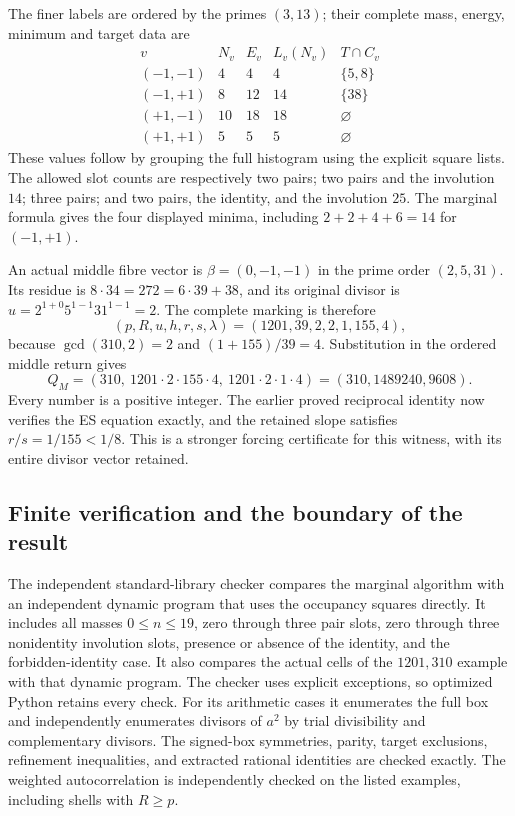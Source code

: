 The finer labels are ordered by the primes $(3,13)$; their complete
mass, energy, minimum and target data are
\[
\begin{array}{c|r|r|r|l}
v&N_v&E_v&L_v(N_v)&T\cap C_v\\\hline
(-1,-1)&4&4&4&\{5,8\}\\
(-1,+1)&8&12&14&\{38\}\\
(+1,-1)&10&18&18&\varnothing\\
(+1,+1)&5&5&5&\varnothing
\end{array}
\]
These values follow by grouping the full histogram using the explicit
square lists. The allowed slot counts are respectively two pairs;
two pairs and the involution $14$; three pairs; and two pairs, the
identity, and the involution $25$. The marginal formula gives the
four displayed minima, including $2+2+4+6=14$ for $(-1,+1)$.

An actual middle fibre vector is $\beta=(0,-1,-1)$ in the prime
order $(2,5,31)$. Its residue is $8\cdot34=272=6\cdot39+38$, and
its original divisor is $u=2^{1+0}5^{1-1}31^{1-1}=2$.
The complete marking is therefore
\[
 (p,R,u,h,r,s,\lambda)=(1201,39,2,2,1,155,4),
\]
because $\gcd(310,2)=2$ and $(1+155)/39=4$. Substitution in the
ordered middle return gives
\[
 Q_M=(310,\ 1201\cdot2\cdot155\cdot4,\ 1201\cdot2\cdot1\cdot4)
     =(310,1489240,9608).
\]
Every number is a positive integer. The earlier proved reciprocal
identity now verifies the ES equation exactly, and the retained
slope satisfies $r/s=1/155<1/8$. This is a stronger forcing
certificate for this witness, with its entire divisor vector retained.

\subsection{Finite verification and the boundary of the result}
The independent standard-library checker compares the marginal algorithm
with an independent dynamic program
that uses the occupancy squares directly. It includes all masses
$0\leq n\leq19$, zero through three pair slots, zero through three
nonidentity involution slots, presence or absence of the identity,
and the forbidden-identity case. It also compares the actual cells
of the $1201,310$ example with that dynamic program. The checker
uses explicit exceptions, so optimized Python retains every check.
For its arithmetic cases it enumerates the full box and independently
enumerates divisors of $a^2$ by trial divisibility and complementary
divisors. The signed-box symmetries, parity, target exclusions,
refinement inequalities, and extracted rational identities are checked
exactly. The weighted autocorrelation is independently checked on
the listed examples, including shells with $R\geq p$.

